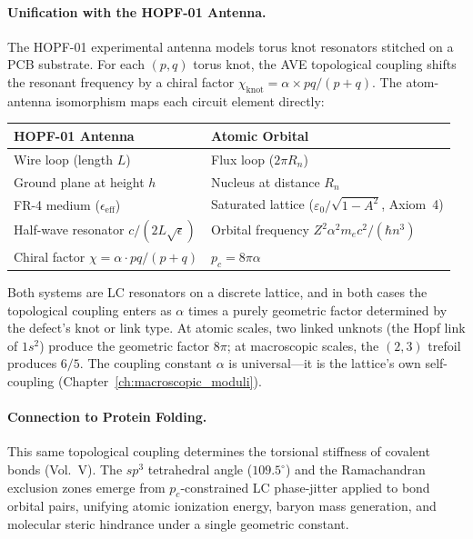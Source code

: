 \paragraph{Unification with the HOPF-01 Antenna.}
The HOPF-01 experimental antenna models torus knot resonators stitched on a PCB substrate. For each $(p,q)$ torus knot, the AVE topological coupling shifts the resonant frequency by a chiral factor $\chi_\text{knot} = \alpha \times pq/(p+q)$. The atom-antenna isomorphism maps each circuit element directly:

\begin{center}
\small
\renewcommand{\arraystretch}{1.2}
\begin{tabular}{ll}
\toprule
\textbf{HOPF-01 Antenna} & \textbf{Atomic Orbital} \\
\midrule
Wire loop (length $L$) & Flux loop ($2\pi R_n$) \\
Ground plane at height $h$ & Nucleus at distance $R_n$ \\
FR-4 medium ($\epsilon_\text{eff}$) & Saturated lattice ($\varepsilon_0 / \sqrt{1 - A^2}$, Axiom~4) \\
Half-wave resonator $c/(2L\sqrt{\epsilon})$ & Orbital frequency $Z^2\alpha^2 m_e c^2/(\hbar n^3)$ \\
Chiral factor $\chi = \alpha \cdot pq/(p+q)$ & $p_c = 8\pi\alpha$ \\
\bottomrule
\end{tabular}
\end{center}

\noindent Both systems are LC resonators on a discrete lattice, and in both cases the topological coupling enters as $\alpha$ times a purely geometric factor determined by the defect's knot or link type. At atomic scales, two linked unknots (the Hopf link of $1s^2$) produce the geometric factor $8\pi$; at macroscopic scales, the $(2,3)$ trefoil produces $6/5$. The coupling constant $\alpha$ is universal---it is the lattice's own self-coupling (Chapter~\ref{ch:macroscopic_moduli}).

\paragraph{Connection to Protein Folding.}
This same topological coupling determines the torsional stiffness of covalent bonds (Vol.~V). The $sp^3$ tetrahedral angle ($109.5^\circ$) and the Ramachandran exclusion zones emerge from $p_c$-constrained LC phase-jitter applied to bond orbital pairs, unifying atomic ionization energy, baryon mass generation, and molecular steric hindrance under a single geometric constant.


